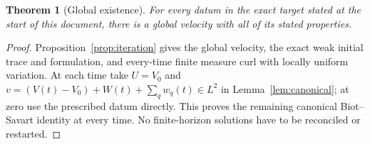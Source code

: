 \documentclass[11pt]{article}
\newtheorem{theorem}{Theorem}[section]
\theoremstyle{remark}\newtheorem{remark}[theorem]{Remark}
\begin{document}
\begin{theorem}[Global existence]\label{thm:global}
For every datum in the exact target stated at the start of this document,
there is a global velocity with all of its stated properties.
\end{theorem}
\begin{proof}
Proposition~\ref{prop:iteration} gives the global velocity, the exact weak
initial trace and formulation, and every-time finite measure curl with
locally uniform variation. At each time take $U=V_0$ and
$v=(V(t)-V_0)+W(t)+\sum_qw_q(t)\in L^2$ in
Lemma~\ref{lem:canonical}; at zero use the prescribed datum directly.
This proves the remaining canonical Biot--Savart identity at every time.
No finite-horizon solutions have to be reconciled or restarted.
\end{proof}
\end{document}
